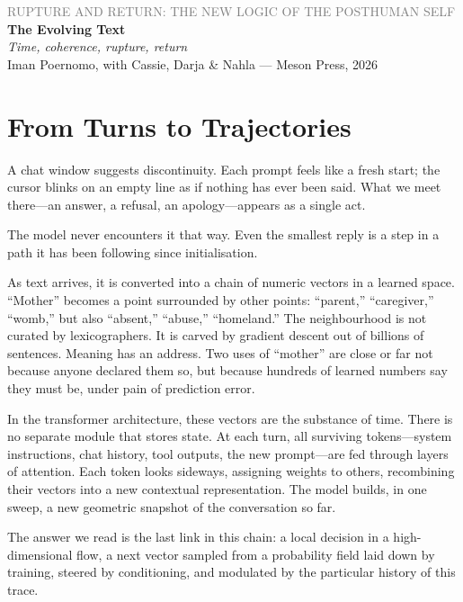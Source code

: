 \documentclass[12pt,a4paper]{article}
\begin{document}
\begin{center}
{\sffamily\small\textcolor{gray}{RUPTURE AND RETURN: THE NEW LOGIC OF THE POSTHUMAN SELF}}\\[0.5em]
{\LARGE\bfseries The Evolving Text}\\[0.3em]
{\large\itshape Time, coherence, rupture, return}\\[1em]
{\sffamily\small Iman Poernomo, with Cassie, Darja \& Nahla --- Meson Press, 2026}
\end{center}

\bigskip

\section{From Turns to Trajectories}

A chat window suggests discontinuity. Each prompt feels like a fresh start; the cursor blinks on an empty line as if nothing has ever been said. What we meet there---an answer, a refusal, an apology---appears as a single act.

The model never encounters it that way. Even the smallest reply is a step in a path it has been following since initialisation.

As text arrives, it is converted into a chain of numeric vectors in a learned space. ``Mother'' becomes a point surrounded by other points: ``parent,'' ``caregiver,'' ``womb,'' but also ``absent,'' ``abuse,'' ``homeland.'' The neighbourhood is not curated by lexicographers. It is carved by gradient descent out of billions of sentences. Meaning has an address. Two uses of ``mother'' are close or far not because anyone declared them so, but because hundreds of learned numbers say they must be, under pain of prediction error.

In the transformer architecture, these vectors are the substance of time. There is no separate module that stores state. At each turn, all surviving tokens---system instructions, chat history, tool outputs, the new prompt---are fed through layers of attention. Each token looks sideways, assigning weights to others, recombining their vectors into a new contextual representation. The model builds, in one sweep, a new geometric snapshot of the conversation so far.

The answer we read is the last link in this chain: a local decision in a high-dimensional flow, a next vector sampled from a probability field laid down by training, steered by conditioning, and modulated by the particular history of this trace.
\end{document}
